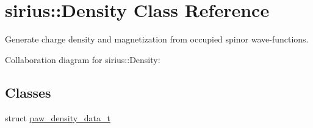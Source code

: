 \hypertarget{classsirius_1_1_density}{}\section{sirius\+:\+:Density Class Reference}
\label{classsirius_1_1_density}


Generate charge density and magnetization from occupied spinor wave-\/functions.  




Collaboration diagram for sirius\+:\+:Density\+:
\subsection*{Classes}
\begin{DoxyCompactItemize}
\item 
struct \hyperlink{structsirius_1_1_density_1_1paw__density__data__t}{paw\+\_\+density\+\_\+data\+\_\+t}
\end{DoxyCompactItemize}
